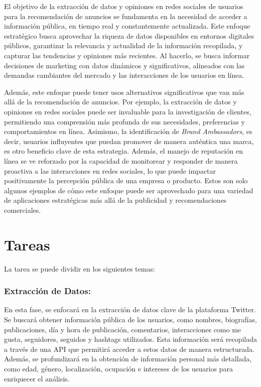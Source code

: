 \documentclass[
]{journal}
\begin{document}
El objetivo de la extracción de datos y opiniones en redes sociales de
usuarios para la recomendación de anuncios se fundamenta en la necesidad
de acceder a información pública, en tiempo real y constantemente
actualizada. Este enfoque estratégico busca aprovechar la riqueza de
datos disponibles en entornos digitales públicos, garantizar la
relevancia y actualidad de la información recopilada, y capturar las
tendencias y opiniones más recientes. Al hacerlo, se busca informar
decisiones de marketing con datos dinámicos y significativos, alineados
con las demandas cambiantes del mercado y las interacciones de los
usuarios en línea.

Además, este enfoque puede tener usos alternativos significativos que
van más allá de la recomendación de anuncios. Por ejemplo, la extracción
de datos y opiniones en redes sociales puede ser invaluable para la
investigación de clientes, permitiendo una comprensión más profunda de
sus necesidades, preferencias y comportamientos en línea. Asimismo, la
identificación de \emph{Brand Ambassadors}, es decir, usuarios
influyentes que puedan promover de manera auténtica una marca, es otro
beneficio clave de esta estrategia. Además, el manejo de reputación en
línea se ve reforzado por la capacidad de monitorear y responder de
manera proactiva a las interacciones en redes sociales, lo que puede
impactar positivamente la percepción pública de una empresa o producto.
Estos son solo algunos ejemplos de cómo este enfoque puede ser
aprovechado para una variedad de aplicaciones estratégicas más allá de
la publicidad y recomendaciones comerciales.

\section{Tareas}\label{tareas}

La tarea se puede dividir en los siguientes temas:

\subsubsection{Extracción de Datos:}\label{extracciuxf3n-de-datos}

En esta fase, se enfocará en la extracción de datos clave de la
plataforma Twitter. Se buscará obtener información pública de los
usuarios, como nombres, biografías, publicaciones, día y hora de
publicación, comentarios, interacciones como me gusta, seguidores,
seguidos y hashtags utilizados. Esta información será recopilada a
través de una API que permitirá acceder a estos datos de manera
estructurada. Además, se profundizará en la obtención de información
personal más detallada, como edad, género, localización, ocupación e
intereses de los usuarios para enriquecer el análisis.
\end{document}
